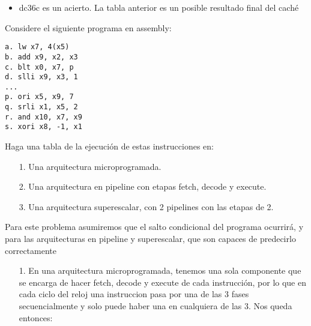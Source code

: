 \documentclass[dcc,sol]{fcfmcourse}
\begin{document}
\begin{problems}
\begin{solution}
\begin{enumerate}
\begin{itemize}
        
        \item dc36c es un acierto. La tabla anterior es un posible resultado final del caché
    \end{itemize}
\end{enumerate}
    
\end{solution}

\problem Considere el siguiente programa en assembly:

\begin{verbatim}
a. lw x7, 4(x5)
b. add x9, x2, x3
c. blt x0, x7, p
d. slli x9, x3, 1
...
p. ori x5, x9, 7
q. srli x1, x5, 2
r. and x10, x7, x9
s. xori x8, -1, x1
\end{verbatim}

Haga una tabla de la ejecución de estas instrucciones en:
\begin{enumerate}
    \item[1.] Una arquitectura microprogramada.
    \item[2.] Una arquitectura en pipeline con etapas fetch, decode y execute.
    \item[3.] Una arquitectura superescalar, con 2 pipelines con las etapas de 2.
\end{enumerate}

\begin{solution}
Para este problema asumiremos que el salto condicional del programa ocurrirá, y para las arquitecturas en pipeline y superescalar, que son capaces de predecirlo correctamente
    \begin{enumerate}
        \item[1.] En una arquitectura microprogramada, tenemos una sola componente que se encarga de hacer fetch, decode y execute de cada instrucción, por lo que en cada ciclo del reloj una instruccion pasa por una de las 3 fases secuencialmente y solo puede haber una en cualquiera de las 3. Nos queda entonces:


\end{enumerate}
\end{solution}
\end{problems}
\end{document}
